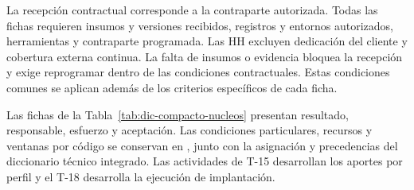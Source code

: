 La recepción contractual corresponde a la contraparte autorizada. Todas las fichas requieren insumos y versiones recibidos, registros y entornos autorizados, herramientas y contraparte programada. Las HH excluyen dedicación del cliente y cobertura externa continua. La falta de insumos o evidencia bloquea la recepción y exige reprogramar dentro de las condiciones contractuales. Estas condiciones comunes se aplican además de los criterios específicos de cada ficha.

Las fichas de la Tabla~\ref{tab:dic-compacto-nucleos} presentan resultado, responsable, esfuerzo y aceptación. Las condiciones particulares, recursos y ventanas por código se conservan en , junto con la asignación y precedencias del diccionario técnico integrado. Las actividades de T-15 desarrollan los aportes por perfil y el T-18 desarrolla la ejecución de implantación.


